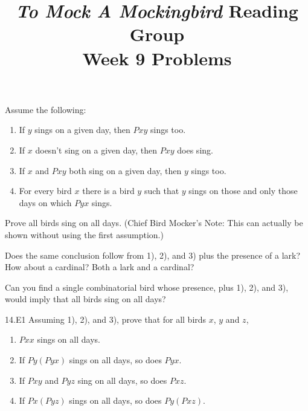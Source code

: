 \documentclass[12pt, letterpaper]{article}
\title{\emph{To Mock A Mockingbird} Reading Group\\Week 9 Problems}
\begin{document}
\maketitle

\disclaimer

\begin{prob}{14.1} 
Assume the following:

\begin{enumerate}[label=\textbf{\arabic*)},itemsep=0mm]
  \item If $y$ sings on a given day, then $Pxy$ sings too.
  \item If $x$ doesn't sing on a given day, then $Pxy$ does sing.
  \item If $x$ and $Pxy$ both sing on a given day, then $y$ sings too.
  \item For every bird $x$ there is a bird $y$ such that $y$ sings on those and only those days on which $Pyx$ sings.
\end{enumerate}

\noindent Prove all birds sing on all days. (Chief Bird Mocker's Note: This can actually be shown without using the first assumption.)
\end{prob}

\begin{prob}{14.2} 
Does the same conclusion follow from 1), 2), and 3) plus the presence of a lark? How about a cardinal? Both a lark and a cardinal?
\end{prob}

\begin{prob}{14.3} 
Can you find a single combinatorial bird whose presence, plus 1), 2), and 3), would imply that all birds sing on all days?
\end{prob}

\begin{prob}{14.E1}
Assuming 1), 2), and 3), prove that for all birds $x$, $y$ and $z$, 
\end{prob}

\begin{enumerate}[label=\textbf{\alph*)},itemsep=0mm]
    \item $Pxx$ sings on all days.
    \item If $Py(Pyx)$ sings on all days, so does $Pyx$.
    \item If $Pxy$ and $Pyz$ sing on all days, so does $Pxz$.
    \addtocounter{enumi}{1}
    \item If $Px(Pyz)$ sings on all days, so does $Py(Pxz)$.
\end{enumerate}
\end{document}
